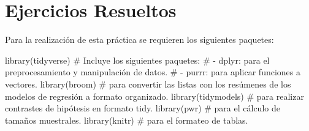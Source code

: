 \documentclass[
  a4paper,
]{scrreport}
\newenvironment{Shaded}{\begin{snugshade}}{\end{snugshade}}
\newcommand{\CommentTok}[1]{\textcolor[rgb]{0.37,0.37,0.37}{#1}}
\newcommand{\FunctionTok}[1]{\textcolor[rgb]{0.28,0.35,0.67}{#1}}
\newcommand{\NormalTok}[1]{\textcolor[rgb]{0.00,0.23,0.31}{#1}}
\theoremstyle{definition}
\theoremstyle{remark}
\begin{document}
\section{Ejercicios Resueltos}\label{ejercicios-resueltos-7}

Para la realización de esta práctica se requieren los siguientes
paquetes:

\begin{Shaded}
\begin{Highlighting}[]
\FunctionTok{library}\NormalTok{(tidyverse)}
\CommentTok{\# Incluye los siguientes paquetes:}
\CommentTok{\# {-} dplyr: para el preprocesamiento y manipulación de datos.}
\CommentTok{\# {-} purrr: para aplicar funciones a vectores.}
\FunctionTok{library}\NormalTok{(broom) }\CommentTok{\# para convertir las listas con los resúmenes de los modelos de regresión a formato organizado.}
\FunctionTok{library}\NormalTok{(tidymodels) }\CommentTok{\# para realizar contrastes de hipótesis en formato tidy.}
\FunctionTok{library}\NormalTok{(pwr) }\CommentTok{\# para el cálculo de tamaños muestrales.}
\FunctionTok{library}\NormalTok{(knitr) }\CommentTok{\# para el formateo de tablas.}
\end{Highlighting}
\end{Shaded}
\end{document}

